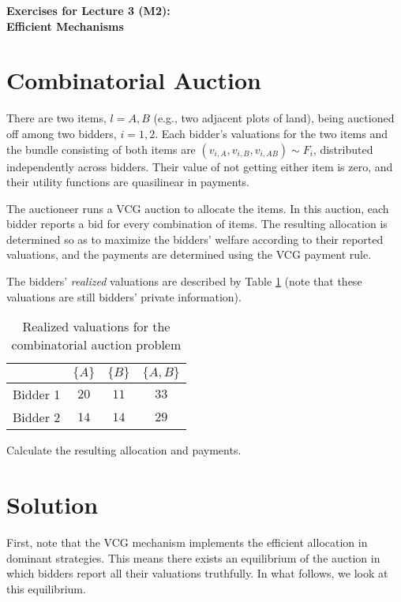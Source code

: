 \documentclass[a4paper]{article}
\newif\ifsolutions
\begin{document}
\begin{center}
		\LARGE\textbf{Exercises for Lecture 3 (M2):\\ Efficient Mechanisms}
\end{center}



\section{Combinatorial Auction}

There are two items, $l=A,B$ (e.g., two adjacent plots of land), being auctioned off among two bidders, $i=1,2$. Each bidder's valuations for the two items and the bundle consisting of both items are $(v_{i,A}, v_{i,B}, v_{i,AB}) \sim F_i$, distributed independently across bidders. Their value of not getting either item is zero, and their utility functions are quasilinear in payments. 

The auctioneer runs a VCG auction to allocate the items. In this auction, each bidder reports a bid for every combination of items. The resulting allocation is determined so as to maximize the bidders' welfare according to their reported valuations, and the payments are determined using the VCG payment rule.

The bidders' \emph{realized} valuations are described by Table \ref{tab:combac} (note that these valuations are still bidders' private information).
\begin{table}[h]
	\begin{center}
		\begin{tabular}{l|c|c|c}
			& $\{A\}$ & $\{B\}$ & $\{A,B\}$  \\ \hline
			Bidder 1 & $20$ & $11$ & $33$ \\
			Bidder 2 & $14$ & $14$ & $29$
		\end{tabular}
	\end{center}
	\caption{Realized valuations for the combinatorial auction problem}
	\label{tab:combac}
\end{table}

Calculate the resulting allocation and payments.

\ifsolutions
\section*{Solution}
	First, note that the VCG mechanism implements the efficient allocation in dominant strategies. This means there exists an equilibrium of the auction in which bidders report all their valuations truthfully. In what follows, we look at this equilibrium.
	
\end{document}
